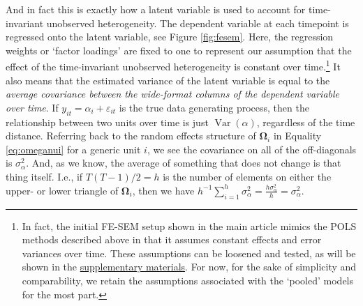 \documentclass[]{interact}
\theoremstyle{plain}%
\theoremstyle{definition}
\theoremstyle{remark}
\begin{document}
And in fact this is exactly how a latent variable is used to account for
time-invariant unobserved heterogeneity. The dependent variable at each
timepoint is regressed onto the latent variable, see Figure
\ref{fig:fesem}. Here, the regression weights or `factor loadings' are
fixed to one to represent our assumption that the effect of the
time-invariant unobserved heterogeneity is constant over
time.\footnote{In fact, the initial FE-SEM setup shown in the main
  article mimics the POLS methods described above in that it assumes
  constant effects and error variances over time. These assumptions can
  be loosened and tested, as will be shown in the
  \href{https://github.com/henrik-andersen/FE-SEM/blob/master/extensions.pdf}{supplementary
  materials}. For now, for the sake of simplicity and comparability, we
  retain the assumptions associated with the `pooled' models for the
  most part.} It also means that the estimated variance of the latent
variable is equal to the
\textit{average covariance between the wide-format columns of the dependent variable over time}.
If \(y_{it} = \alpha_{i} + \varepsilon_{it}\) is the true data
generating process, then the relationship between two units over time is
just \(\mathop{\mathrm{\mathrm{Var}}}(\alpha)\), regardless of the time
distance. Referring back to the random effects structure of
\(\bm{\Omega}_{i}\) in Equality \eqref{eq:omeganui} for a generic unit
\(i\), we see the covariance on all of the off-diagonals is
\(\sigma^{2}_{\alpha}\). And, as we know, the average of something that
does not change is that thing itself. I.e., if \(T(T-1)/2 = h\) is the
number of elements on either the upper- or lower triangle of
\(\bm{\Omega}_{i}\), then we have
\(h^{-1}\sum_{i=1}^{h}\sigma^{2}_{\alpha} = \frac{h \sigma^{2}_{\alpha}}{h} = \sigma^{2}_{\alpha}\).
\end{document}
